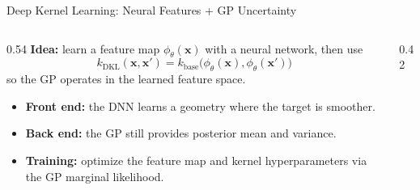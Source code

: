 \documentclass[aspectratio=169,11pt]{beamer}
\newcommand{\x}{\bm{x}}
\begin{document}
\begin{frame}{Deep Kernel Learning: Neural Features + GP Uncertainty}
\small
\begin{columns}[T]
\begin{column}{0.54\textwidth}
\textbf{Idea:} learn a feature map $\phi_{\theta}(\x)$ with a neural network, then use
\[
\textstyle k_{\text{DKL}}(\x,\x') = k_{\text{base}}\bigl(\phi_{\theta}(\x), \phi_{\theta}(\x')\bigr)
\]
so the GP operates in the learned feature space.

\vspace{0.05cm}
\begin{itemize}\itemsep0.1em
  \item \textbf{Front end:} the DNN learns a geometry where the target is smoother.
  \item \textbf{Back end:} the GP still provides posterior mean and variance.
  \item \textbf{Training:} optimize the feature map and kernel hyperparameters via the GP marginal likelihood.
\end{itemize}

\end{column}

\begin{column}{0.42\textwidth}
\begin{center}
\end{center}
\end{column}
\end{columns}
\end{frame}
\end{document}
